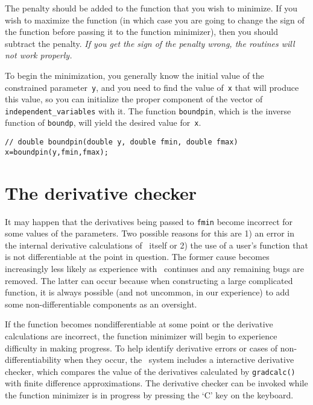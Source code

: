 \documentclass{admbmanual}
\begin{document}
The penalty should be added to the function that you wish to minimize. If you
wish to maximize the function (in which case you are going to change the sign of
the function before passing it to the function minimizer), then you should
subtract the penalty. \textit{If you get the sign of the penalty wrong, the
  routines will not work properly.}

To begin the minimization, you generally know the initial value of the
constrained parameter~\texttt{y}, and you need to find the value of~\texttt{x}
that will produce this value, so you can initialize the proper component of the
vector of \texttt{independent\_variables} with it. The function
\texttt{boundpin}, which is the inverse function of \texttt{boundp}, will yield
the desired value for~\texttt{x}.
\begin{lstlisting}
// double boundpin(double y, double fmin, double fmax)
x=boundpin(y,fmin,fmax);
\end{lstlisting}

\section{The derivative checker}

It may happen that the derivatives being passed to \texttt{fmin} become
incorrect for some values of the parameters. Two possible reasons for this are
1) an error in the internal derivative calculations of \scAD\ itself or 2) the
use of a user's function that is not differentiable at the point in question.
The former cause becomes increasingly less likely as experience with \scAD\
continues and any remaining bugs are removed. The latter can occur because when
constructing a large complicated function, it is always possible (and not
uncommon, in our experience) to add some non-differentiable components as an
oversight.

If the function becomes nondifferentiable at some point or the derivative
calculations are incorrect, the function minimizer will begin to experience
difficulty in making progress. To help identify derivative errors or cases of
non-differentiability when they occur, the \scAD\ system includes a interactive
derivative checker, which compares the value of the derivatives calculated by
\texttt{gradcalc()} with finite difference approximations. The derivative
checker can be invoked while the function minimizer is in progress by pressing
the `C' key on the keyboard.
\end{document}
